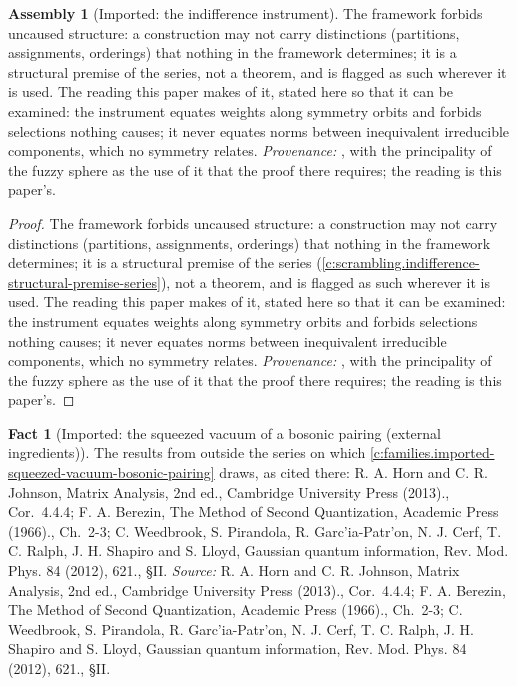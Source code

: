 \documentclass[11pt]{article}
\theoremstyle{definition}
\newtheorem{fact}[theorem]{Fact}
\newtheorem{assembled}[theorem]{Assembly}
\theoremstyle{plain}
\begin{document}
\begin{assembled}[Imported: the indifference instrument]\label{c:families.imported-indifference-instrument}
The framework forbids uncaused structure: a construction may not carry distinctions (partitions, assignments, orderings) that nothing in the framework determines; it is a structural premise of the series, not a theorem, and is flagged as such wherever it is used. The reading this paper makes of it, stated here so that it can be examined: the instrument equates weights along symmetry orbits and forbids selections nothing causes; it never equates norms between inequivalent irreducible components, which no symmetry relates. \emph{Provenance:} \cite[Principle~5.4]{ButlerT8}, with the principality of the fuzzy sphere \cite[Thm.~5.5]{ButlerT8} as the use of it that the proof there requires; the reading is this paper's.
\end{assembled}
\begin{proof}
The framework forbids uncaused structure: a construction may not carry distinctions (partitions, assignments, orderings) that nothing in the framework determines; it is a structural premise of the series (\ref{c:scrambling.indifference-structural-premise-series}), not a theorem, and is flagged as such wherever it is used. The reading this paper makes of it, stated here so that it can be examined: the instrument equates weights along symmetry orbits and forbids selections nothing causes; it never equates norms between inequivalent irreducible components, which no symmetry relates. \emph{Provenance:} \cite[Principle~5.4]{ButlerT8}, with the principality of the fuzzy sphere \cite[Thm.~5.5]{ButlerT8} as the use of it that the proof there requires; the reading is this paper's.

\end{proof}

\begin{fact}[Imported: the squeezed vacuum of a bosonic pairing (external ingredients)]\label{c:families.imported-squeezed-vacuum-bosonic-pairing-external}
The results from outside the series on which \ref{c:families.imported-squeezed-vacuum-bosonic-pairing} draws, as cited there: R. A. Horn and C. R. Johnson, Matrix Analysis, 2nd ed., Cambridge University Press (2013)., Cor.~4.4.4; F. A. Berezin, The Method of Second Quantization, Academic Press (1966)., Ch.~2-3; C. Weedbrook, S. Pirandola, R. Garc'ia-Patr'on, N. J. Cerf, T. C. Ralph, J. H. Shapiro and S. Lloyd, Gaussian quantum information, Rev. Mod. Phys. 84 (2012), 621., \S II.
\emph{Source:} R. A. Horn and C. R. Johnson, Matrix Analysis, 2nd ed., Cambridge University Press (2013)., Cor.~4.4.4; F. A. Berezin, The Method of Second Quantization, Academic Press (1966)., Ch.~2-3; C. Weedbrook, S. Pirandola, R. Garc'ia-Patr'on, N. J. Cerf, T. C. Ralph, J. H. Shapiro and S. Lloyd, Gaussian quantum information, Rev. Mod. Phys. 84 (2012), 621., \S II.
\end{fact}
\end{document}
